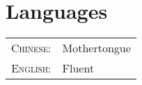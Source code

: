 \documentclass[letterpaper,10pt]{ctexart}
\begin{document}
\section{Languages}
\begin{tabular}{rl}
 \textsc{Chinese:}&Mothertongue\\
\textsc{English:}&Fluent\\
\end{tabular}
\end{document}
